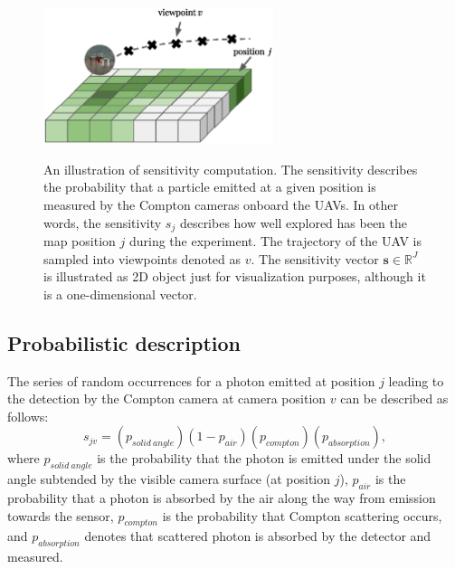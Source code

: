 \begin{figure}[!h]
  \centering
    \includegraphics[width=0.6\textwidth]{./fig/photos/sen.eps}
    \label{fig:sen_illustration}
  \caption{An illustration of sensitivity computation. 
  The sensitivity describes the probability that a particle emitted at a given position is measured by the Compton cameras onboard the \ac{UAV}s. 
  In other words, the sensitivity $s_{j}$ describes how well explored has been the map position $j$ during the experiment. 
  The trajectory of the \ac{UAV} is sampled into viewpoints denoted as $v$.
  The sensitivity vector $\mathbf{s}\in\mathbb{R}^{J}$ is illustrated as 2D object just for visualization purposes, although it is a one-dimensional vector.}
\end{figure}%

\subsection{Probabilistic description}%
The series of random occurrences for a photon emitted at position $j$ leading to the detection by the Compton camera at camera position $v$ can be described as follows:
\begin{equation}
  s_{jv} =  (p_{solid\ angle})(1-p_{air})(p_{compton})(p_{absorption}),
  \label{eq:sen_prob}
\end{equation}
where $p_{solid\ angle}$ is the probability that the photon is emitted under the solid angle subtended by the visible camera surface (at position $j$), 
$p_{air}$ is the probability that a photon is absorbed by the air along the way from emission towards the sensor, 
$p_{compton}$ is the probability that Compton scattering occurs, and $p_{absorption}$ denotes that scattered photon is absorbed by the detector and measured.

